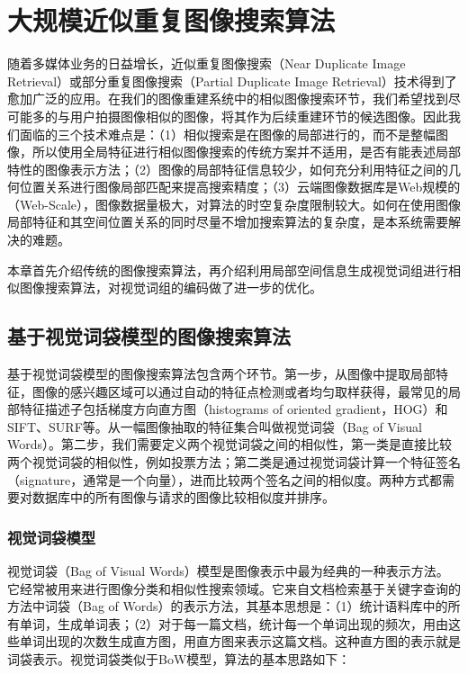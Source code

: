 

\chapter{大规模近似重复图像搜索算法}

随着多媒体业务的日益增长，近似重复图像搜索（Near Duplicate Image Retrieval）或部分重复图像搜索（Partial Duplicate Image Retrieval）技术得到了愈加广泛的应用。在我们的图像重建系统中的相似图像搜索环节，我们希望找到尽可能多的与用户拍摄图像相似的图像，将其作为后续重建环节的候选图像。因此我们面临的三个技术难点是：（1）相似搜索是在图像的局部进行的，而不是整幅图像，所以使用全局特征进行相似图像搜索的传统方案并不适用，是否有能表述局部特性的图像表示方法；（2）图像的局部特征信息较少，如何充分利用特征之间的几何位置关系进行图像局部匹配来提高搜索精度；（3）云端图像数据库是Web规模的（Web-Scale），图像数据量极大，对算法的时空复杂度限制较大。如何在使用图像局部特征和其空间位置关系的同时尽量不增加搜索算法的复杂度，是本系统需要解决的难题。

本章首先介绍传统的图像搜索算法，再介绍利用局部空间信息生成视觉词组进行相似图像搜索算法，对视觉词组的编码做了进一步的优化。

\section{基于视觉词袋模型的图像搜索算法}

基于视觉词袋模型的图像搜索算法包含两个环节。第一步，从图像中提取局部特征，图像的感兴趣区域可以通过自动的特征点检测或者均匀取样获得，最常见的局部特征描述子包括梯度方向直方图（histograms of oriented gradient，HOG）和SIFT、SURF等。从一幅图像抽取的特征集合叫做视觉词袋（Bag of Visual Words）。第二步，我们需要定义两个视觉词袋之间的相似性，第一类是直接比较两个视觉词袋的相似性，例如投票方法；第二类是通过视觉词袋计算一个特征签名（signature，通常是一个向量），进而比较两个签名之间的相似度。两种方式都需要对数据库中的所有图像与请求的图像比较相似度并排序\cite{POLICY:2013te}。

\subsection{视觉词袋模型}
视觉词袋（Bag of Visual Words）模型是图像表示中最为经典的一种表示方法。它经常被用来进行图像分类和相似性搜索领域。它来自文档检索基于关键字查询的方法中词袋（Bag of Words）的表示方法，其基本思想是：（1）统计语料库中的所有单词，生成单词表；（2）对于每一篇文档，统计每一个单词出现的频次，用由这些单词出现的次数生成直方图，用直方图来表示这篇文档。这种直方图的表示就是词袋表示。视觉词袋类似于BoW模型，算法的基本思路如下：

